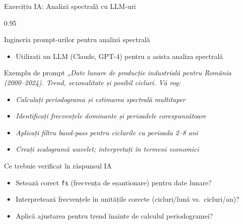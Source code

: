 \documentclass[9pt, aspectratio=169, t]{beamer}
\begin{document}
\begin{frame}{Exercițiu IA: Analiză spectrală cu LLM-uri}
    \begin{cminipage}{0.95\textwidth}
    \vspace{-2mm}
    \begin{block}{Ingineria prompt-urilor pentru analiză spectrală}
        \begin{itemize}\setlength{\itemsep}{0pt}
            \item Utilizați un LLM (Claude, GPT-4) pentru a asista analiza spectrală
        \end{itemize}
    \end{block}
    \vspace{-2mm}
    \begin{exampleblock}{Exemplu de prompt}
        {\small \textit{„Date lunare de producție industrială pentru România (2000--2024). Trend, sezonalitate și posibil cicluri. Vă rog:}}
        \begin{itemize}\setlength{\itemsep}{-2pt}
            \item \small\textit{Calculați periodograma și estimarea spectrală multitaper}
            \item \small\textit{Identificați frecvențele dominante și perioadele corespunzătoare}
            \item \small\textit{Aplicați filtru band-pass pentru ciclurile cu perioada 2--8 ani}
            \item \small\textit{Creați scalogramă wavelet; interpretați în termeni economici}
        \end{itemize}
    \end{exampleblock}
    \vspace{-2mm}
    \begin{alertblock}{Ce trebuie verificat în răspunsul IA}
        {\small
        \begin{itemize}\setlength{\itemsep}{-2pt}
            \item Setează corect \texttt{fs} (frecvența de eșantionare) pentru date lunare?
            \item Interpretează frecvențele în unitățile corecte (cicluri/lună vs.\ cicluri/an)?
            \item Aplică ajustarea pentru trend înainte de calculul periodogramei?
        \end{itemize}}
    \end{alertblock}
    \end{cminipage}
\end{frame}
\end{document}
